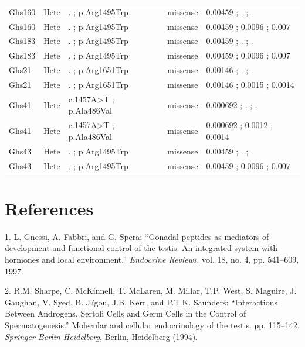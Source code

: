 \documentclass[12pt,twoside]{reedthesis}
\theoremstyle{definition}
\theoremstyle{definition}
\theoremstyle{remark}
\begin{document}
\begin{landscape}
\begin{longtable}[t]{lllll}
  Ghs160 & Hete & . ; p.Arg1495Trp & missense & 0.00459 ; . ; .\\
  \addlinespace
  Ghs160 & Hete & . ; p.Arg1495Trp & missense & 0.00459 ; 0.0096 ; 0.007\\
  Ghs183 & Hete & . ; p.Arg1495Trp & missense & 0.00459 ; . ; .\\
  Ghs183 & Hete & . ; p.Arg1495Trp & missense & 0.00459 ; 0.0096 ; 0.007\\
  Ghs21 & Hete & . ; p.Arg1651Trp & missense & 0.00146 ; . ; .\\
  Ghs21 & Hete & . ; p.Arg1651Trp & missense & 0.00146 ; 0.0015 ; 0.0014\\
  \addlinespace
  Ghs41 & Hete & c.1457A>T ; p.Ala486Val & missense & 0.000692 ; . ; .\\
  Ghs41 & Hete & c.1457A>T ; p.Ala486Val & missense & 0.000692 ; 0.0012 ; 0.0014\\
  Ghs43 & Hete & . ; p.Arg1495Trp & missense & 0.00459 ; . ; .\\
  Ghs43 & Hete & . ; p.Arg1495Trp & missense & 0.00459 ; 0.0096 ; 0.007\\
  \bottomrule
  \end{longtable}
  \end{landscape}
  
  \backmatter
  
  \chapter*{References}\label{references}
  
  \noindent
  
  \setlength{\parindent}{-0.20in} \setlength{\leftskip}{0.20in}
  \setlength{\parskip}{8pt}
  
  \hypertarget{refs}{}
  \hypertarget{ref-Gnessi1997}{}
  1. L. Gnessi, A. Fabbri, and G. Spera: ``Gonadal peptides as mediators
  of development and functional control of the testis: An integrated
  system with hormones and local environment.'' \emph{Endocrine Reviews}.
  vol. 18, no. 4, pp. 541--609, 1997.
  
  \hypertarget{ref-Sharpe1994}{}
  2. R.M. Sharpe, C. McKinnell, T. McLaren, M. Millar, T.P. West, S.
  Maguire, J. Gaughan, V. Syed, B. J?gou, J.B. Kerr, and P.T.K. Saunders:
  ``Interactions Between Androgens, Sertoli Cells and Germ Cells in the
  Control of Spermatogenesis.'' Molecular and cellular endocrinology of
  the testis. pp. 115--142. \emph{Springer Berlin Heidelberg}, Berlin,
  Heidelberg (1994).
  
\end{document}
